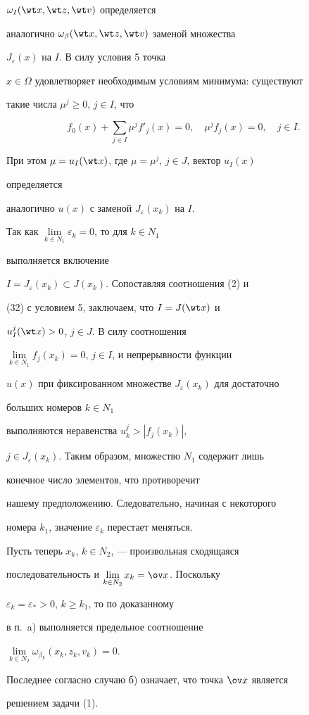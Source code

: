 \begin{pf}
$\omega_I(\wt x,\wt z,\wt v)$ определяется 


аналогично $\omega_\beta(\wt x,\wt z,\wt v)$ заменой множества 


$J_\varepsilon(x)$ на $I$. В силу условия 5 точка 


$x\in \Omega$ удовлетворяет необходимым условиям минимума: существуют 


такие числа $\mu^j\ge 0$, $j\in I$, что 


\begin{equation} 


f_0(x)+\sum_{j\in I}\mu^j f'_j(x)=0,\quad 


\mu^j f_j(x)=0,\quad j\in I. 


\end{equation} 


При этом $\mu=u_I(\wt x)$, где $\mu=\mu^j$, $j\in J$, вектор $u_I(x)$ 


определяется 


аналогично $u(x)$ с заменой $J_\varepsilon(x_k)$ на $I$. 


 


Так как $\lim\limits_{k\in N_1}\varepsilon_k=0$, то для $k\in N_1$ 


выполняется включение 


$I=J_\varepsilon(x_k)\subset J(x_k)$. Сопоставляя соотношения (2) и 


(32) с условием 5, заключаем, что $I=J(\wt x)$ и 


$u^j_I(\wt x)>0$, $j\in J$. В силу соотношения 


$\lim\limits_{k\in N_1}f_j(x_k)=0$, $j\in I$, и непрерывности функции 


$u(x)$ при фиксированном множестве $J_\varepsilon(x_k)$ для достаточно 


больших номеров $k\in N_1$ 


выполняются неравенства $u^j_k>|f_j(x_k)|$, 


$j\in J_\varepsilon(x_k)$. Таким образом, множество $N_1$ содержит лишь 


конечное число элементов, что противоречит 


нашему предположению. Следовательно, начиная с некоторого 


номера $k_1$, значение $\varepsilon_k$ перестает меняться. 


 


Пусть теперь $x_k$, $k\in N_2$, --- произвольная сходящаяся 


последовательность и $\lim\limits_{k\in N_2}x_k=\ov x$. Поскольку 


$\varepsilon_k=\varepsilon_*>0$, $k\ge k_1$, то по доказанному 


в п.~a) выполняется предельное соотношение 


$\lim\limits_{k\in N_2}\omega_{\beta_k}(x_k,z_k,v_k)=0$. 


Последнее согласно случаю б) означает, что точка $\ov x$ является 


решением задачи (1). 


\end{pf} 


